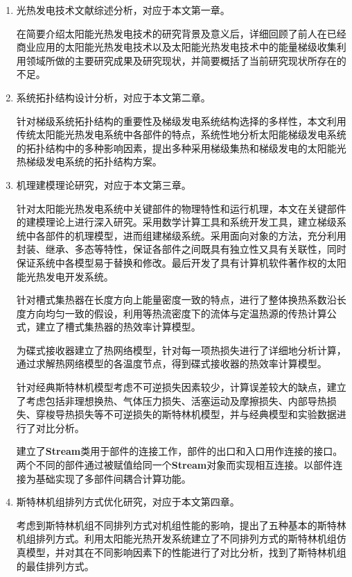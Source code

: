 \begin{enumerate}[label=(\arabic*)]
	
	\item 光热发电技术文献综述分析，对应于本文第一章。
	\setlength\parindent{2em}
	
	在简要介绍太阳能光热发电技术的研究背景及意义后，详细回顾了前人在已经商业应用的太阳能光热发电技术以及太阳能光热发电技术中的能量梯级收集利用领域所做的主要研究成果及研究现状，并简要概括了当前研究现状所存在的不足。
	\item 系统拓扑结构设计分析，对应于本文第二章。
	
	针对梯级系统拓扑结构的重要性及梯级发电系统结构选择的多样性，本文利用传统太阳能光热发电系统中各部件的特点，系统性地分析太阳能梯级发电系统的拓扑结构中的多种影响因素，提出多种采用梯级集热和梯级发电的太阳能光热梯级发电系统的拓扑结构方案。 

	\item 机理建模理论研究，对应于本文第三章。
	
	针对太阳能光热发电系统中关键部件的物理特性和运行机理，本文在关键部件的建模理论上进行深入研究。采用数学计算工具和系统开发工具，建立梯级系统中各部件的机理模型，进而组建梯级系统。采用面向对象的方法，充分利用封装、继承、多态等特性，保证各部件之间既具有独立性又具有关联性，同时保证系统中各模型易于替换和修改。最后开发了具有计算机软件著作权的太阳能光热发电开发系统。
	
	针对槽式集热器在长度方向上能量密度一致的特点，进行了整体换热系数沿长度方向均匀一致的假设，利用等热流密度下的流体与定温热源的传热计算公式，建立了槽式集热器的热效率计算模型。
	
	为碟式接收器建立了热网络模型，针对每一项热损失进行了详细地分析计算，通过求解热网络模型的各温度节点，得到碟式接收器的热效率计算模型。
	
	针对经典斯特林机模型考虑不可逆损失因素较少，计算误差较大的缺点，建立了考虑包括非理想换热、气体压力损失、活塞运动及摩擦损失、内部导热损失、穿梭导热损失等不可逆损失的斯特林机模型，并与经典模型和实验数据进行了对比分析。
	
	建立了\textbf{Stream}类用于部件的连接工作，部件的出口和入口用作连接的接口。两个不同的部件通过被赋值给同一个\textbf{Stream}对象而实现相互连接。以部件连接为基础实现了多部件间耦合计算功能。

	\item 斯特林机组排列方式优化研究，对应于本文第四章。
	
	考虑到斯特林机组不同排列方式对机组性能的影响，提出了五种基本的斯特林机组排列方式。利用太阳能光热开发系统建立了不同排列方式的斯特林机组仿真模型，并对其在不同影响因素下的性能进行了对比分析，找到了斯特林机组的最佳排列方式。


\end{enumerate}
